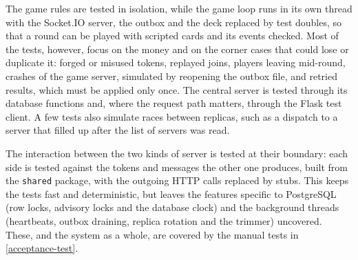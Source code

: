 \documentclass{scrartcl}
\begin{document}
The game rules are tested in isolation, while the game loop runs in its own thread with the Socket.IO server, the outbox and the deck replaced by test doubles, so that a round can be played with scripted cards and its events checked.
Most of the tests, however, focus on the money and on the corner cases that could lose or duplicate it: forged or misused tokens, replayed joins, players leaving mid-round, 
crashes of the game server, simulated by reopening the outbox file, and retried results, which must be applied only once.
The central server is tested through its database functions and, where the request path matters, through the Flask test client. A few tests also simulate races between replicas, such as a dispatch to a server that filled up after the list of servers was read.

The interaction between the two kinds of server is tested at their boundary: each side is tested against the tokens and messages the other one produces, built from the \texttt{shared} package, with the outgoing HTTP calls replaced by stubs.
This keeps the tests fast and deterministic, but leaves the features specific to PostgreSQL (row locks, advisory locks and the database clock) and the background threads (heartbeats, outbox draining, replica rotation and the trimmer) uncovered.
These, and the system as a whole, are covered by the manual tests in \cref{acceptance-test}.

  
  

\end{document}
